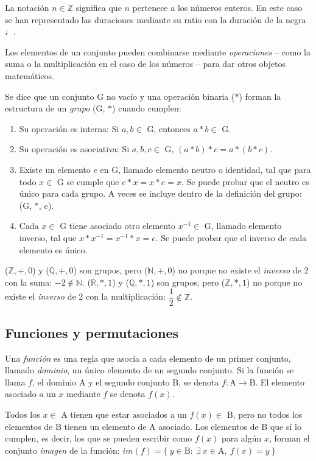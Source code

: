 		La notaci\'on $n\in\mathbb{Z}$ significa que $n$ pertenece a los n\'umeros enteros. En este caso se han representado las duraciones mediante su ratio con la duraci\'on de la negra $\quarternote$.
	
		Los elementos de un conjunto pueden combinarse mediante \emph{operaciones} -- como la suma o la multiplicaci\'on en el caso de los n\'umeros -- para dar otros objetos matem\'aticos. 
		
		Se dice que un conjunto G no vac\'io y una operaci\'on binaria ($\ast$) forman la estructura de un \emph{grupo} (G, $\ast$) cuando cumplen:
	
		\begin{enumerate}
			\item{Su operaci\'on es interna: Si $a,b\in$ G, entonces $a\ast b\in$ G.}		
			\item{Su operaci\'on es asociativa: Si $a,b,c\in$ G, $(a\ast b)\ast c=a\ast(b\ast c)$. }
			\item{Existe un elemento $e$ en G, llamado elemento neutro o identidad, tal que para todo $x\in$ G se cumple que $e\ast x = x\ast e = x$. Se puede probar que el neutro es \'unico para cada grupo. A veces se incluye dentro de la definici\'on del grupo: (G, $\ast$, $e$).}
			\item{Cada $x\in$ G tiene asociado otro elemento $x^{-1}\in$ G, llamado elemento inverso, tal que $x \ast x^{-1} = x^{-1}  \ast x = e$. Se puede probar que el inverso de cada elemento es \'unico.}		
		\end{enumerate}
	
	($\mathbb{Z},+,0$) y ($\mathbb{Q},+,0$) son grupos, pero ($\mathbb{N},+,0$) no porque no existe el \textit{inverso} de 2 con la suma: $-2\notin\mathbb{N}$. ($\mathbb{R},*,1$) y ($\mathbb{Q},*,1$) son grupos, pero ($\mathbb{Z},*,1$) no porque no existe el \textit{inverso} de 2 con la multiplicaci\'on: $\dfrac12\notin\mathbb{Z}$.
	
	\subsection{Funciones y permutaciones}
		Una \emph{funci\'on} es una regla que asocia a cada elemento de un primer conjunto, llamado \emph{dominio}, un \'unico elemento de un segundo conjunto. Si la funci\'on se llama $f$, el dominio A y el segundo conjunto B, se denota $f:\mbox{A}\to \mbox{B}$. El elemento asociado a un $x$ mediante $f$ se denota $f(x)$.
		
		Todos los $x\in$ A tienen que estar asociados a un $f(x)\in$ B, pero no todos los elementos de B tienen un elemento de A asociado. Los elementos de B que s\'i lo cumplen, es decir, los que se pueden escribir como $f(x)$ para alg\'un $x$, forman el conjunto \emph{imagen} de la funci\'on: $im(f)=\{\ y\in \mbox{B}:\ \exists\ x \in \mbox{A},\ f(x)=y\ \}$
		
